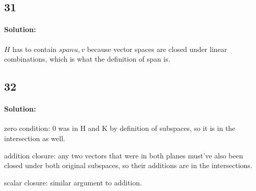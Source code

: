 \documentclass[11pt, notitlepage]{report}
\newenvironment{solution}{\paragraph{Solution:}}{\hfill}
\begin{document}
\subsection{31}
\begin{solution}
   $H$ has to contain $span{u,v}$ because vector spaces are closed under linear combinations, which is what the definition of span is.
\end{solution}
\subsection{32}
\begin{solution}
   zero condition: 0 was in H and K by definition of subspaces, so it is in the intersection as well.
     
      addition closure: any two vectors that were in both planes must've also been closed under both original subspaces, so their additions are in the intersections.

      scalar closure: similar argument to addition.
\end{solution}
\end{document}
